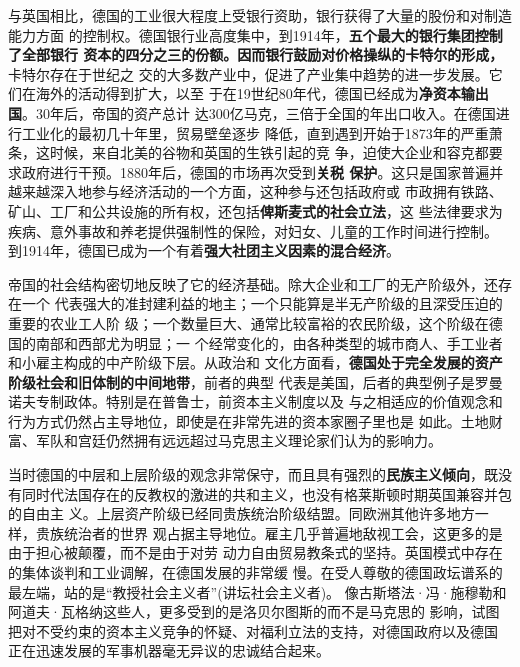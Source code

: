 与英国相比，德国的工业很大程度上受银行资助，银行获得了大量的股份和对制造能力方面
的控制权。德国银行业高度集中，到1914年，\textbf{五个最大的银行集团控制了全部银行
  资本的四分之三的份额。因而银行鼓励对价格操纵的卡特尔的形成，}卡特尔存在于世纪之
交的大多数产业中，促进了产业集中趋势的进一步发展。它们在海外的活动得到扩大，以至
于在19世纪80年代，德国已经成为\textbf{净资本输出国}。30年后，帝国的资产总计
达300亿马克，三倍于全国的年出口收入。在德国进行工业化的最初几十年里，贸易壁垒逐步
降低，直到遇到开始于1873年的严重萧条，这时候，来自北美的谷物和英国的生铁引起的竞
争，迫使大企业和容克都要求政府进行干预。1880年后，德国的市场再次受到\textbf{关税
  保护}。这只是国家普遍并越来越深入地参与经济活动的一个方面，这种参与还包括政府或
市政拥有铁路、矿山、工厂和公共设施的所有权，还包括\textbf{俾斯麦式的社会立法}，这
些法律要求为疾病、意外事故和养老提供强制性的保险，对妇女、儿童的工作时间进行控制。
到1914年，德国已成为一个有着\textbf{强大社团主义因素的混合经济}。

帝国的社会结构密切地反映了它的经济基础。除大企业和工厂的无产阶级外，还存在一个
代表强大的准封建利益的地主；一个只能算是半无产阶级的且深受压迫的重要的农业工人阶
级；一个数量巨大、通常比较富裕的农民阶级，这个阶级在德国的南部和西部尤为明显；一
个经常变化的，由各种类型的城市商人、手工业者和小雇主构成的中产阶级下层。从政治和
文化方面看，\textbf{德国处于完全发展的资产阶级社会和旧体制的中间地带}，前者的典型
代表是美国，后者的典型例子是罗曼诺夫专制政体。特别是在普鲁士，前资本主义制度以及
与之相适应的价值观念和行为方式仍然占主导地位，即使是在非常先进的资本家圈子里也是
如此。土地财富、军队和宫廷仍然拥有远远超过马克思主义理论家们认为的影响力。

当时德国的中层和上层阶级的观念非常保守，而且具有强烈的\textbf{民族主义倾向}，既没
有同时代法国存在的反教权的激进的共和主义，也没有格莱斯顿时期英国兼容并包的自由主
义。上层资产阶级已经同贵族统治阶级结盟。同欧洲其他许多地方一样，贵族统治者的世界
观占据主导地位。雇主几乎普遍地敌视工会，这更多的是由于担心被颠覆，而不是由于对劳
动力自由贸易教条式的坚持。英国模式中存在的集体谈判和工业调解，在德国发展的非常缓
慢。在受人尊敬的德国政坛谱系的最左端，站的是“教授社会主义者”(讲坛社会主义者)。
像古斯塔法·冯·施穆勒和阿道夫·瓦格纳这些人，更多受到的是洛贝尔图斯的而不是马克思的
影响，试图把对不受约束的资本主义竞争的怀疑、对福利立法的支持，对德国政府以及德国
正在迅速发展的军事机器毫无异议的忠诚结合起来。


